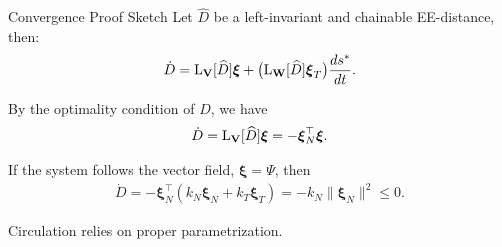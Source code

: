 \begin{frame}{Convergence Proof Sketch}
    Let $\widehat{D}$ be a left-invariant and chainable EE-distance, then:
    \begin{align*}
        \dot{D} = \operatorname{L}_\mathbf{V}[\widehat{D}]\boldsymbol{\xi} + \bigl(\operatorname{L}_\mathbf{W}[\widehat{D}]\boldsymbol{\xi}_T\bigr)\frac{ds^*}{dt}.
    \end{align*}

    By the optimality condition of $D$, we have
    \begin{align*}
        \dot{D} = \operatorname{L}_\mathbf{V}[\widehat{D}]\boldsymbol{\xi} = -\boldsymbol{\xi}_N^\top\boldsymbol{\xi}.
    \end{align*}

    If the system follows the vector field, $\boldsymbol{\xi}=\Psi$, then
    \begin{align*}
        \dot{D} = -\boldsymbol{\xi}_N^\top(k_N\boldsymbol{\xi}_N + k_T\boldsymbol{\xi}_T)
         =-k_N\|\boldsymbol{\xi}_N\|^2 \le 0.
    \end{align*}

    Circulation relies on proper parametrization.
    
\end{frame}

